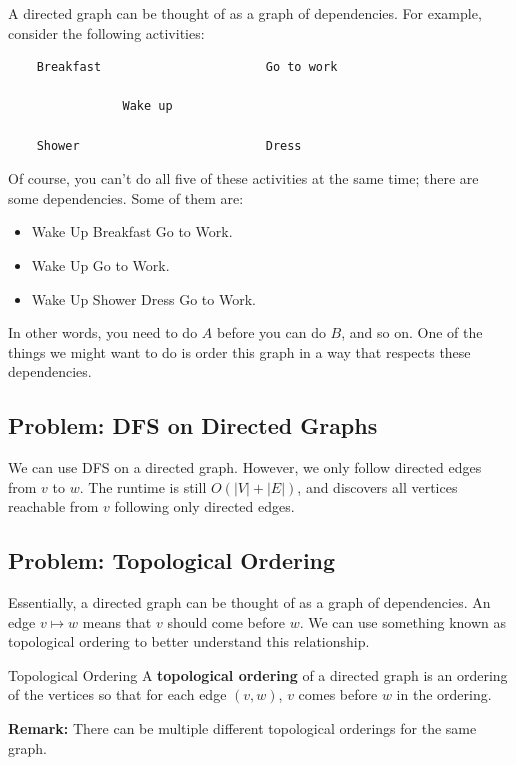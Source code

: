\documentclass[letterpaper]{article}
\begin{document}
\bigskip 

A directed graph can be thought of as a graph of dependencies. For example, consider the following activities:
\begin{verbatim}
    Breakfast                       Go to work

                Wake up 

    Shower                          Dress 
\end{verbatim}
Of course, you can't do all five of these activities at the same time; there are some dependencies. Some of them are: 
\begin{itemize}
    \item Wake Up \textrightarrow{} Breakfast \textrightarrow{} Go to Work. 
    \item Wake Up \textrightarrow{} Go to Work. 
    \item Wake Up \textrightarrow{} Shower \textrightarrow{} Dress \textrightarrow{} Go to Work. 
\end{itemize}
In other words, you need to do $A$ before you can do $B$, and so on. One of the things we might want to do is order this graph in a way that respects these dependencies.

\subsection{Problem: DFS on Directed Graphs}
We can use DFS on a directed graph. However, we only follow directed edges from $v$ to $w$. The runtime is still $O(|V| + |E|)$, and  discovers all vertices reachable from $v$ following only directed edges. 


\subsection{Problem: Topological Ordering}
Essentially, a directed graph can be thought of as a graph of dependencies. An edge $v \mapsto w$ means that $v$ should come before $w$. We can use something known as topological ordering to better understand this relationship.

\begin{definition}{Topological Ordering}{}
    A \textbf{topological ordering} of a directed graph is an ordering of the vertices so that for each edge $(v, w)$, $v$ comes before $w$ in the ordering.
\end{definition}
\textbf{Remark:} There can be multiple different topological orderings for the same graph.
\end{document}
